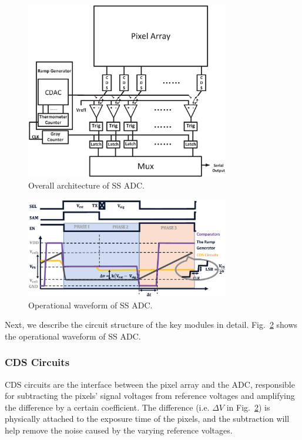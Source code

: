 \begin{figure}[htbp]
	\centerline{\includegraphics[width=3.5in]{./Figures/SSADC.eps}}
	\caption{Overall architecture of SS ADC.}
	\label{SSADC}
\end{figure} 

\begin{figure}[htbp]
	\centerline{\includegraphics[width=3.5in]{./Figures/SSWAVE.eps}}
	\caption{Operational waveform of SS ADC.}
	\label{SSWAVE}
\end{figure}

Next, we describe the circuit structure of the key modules in detail. Fig.~\ref{SSWAVE} shows
the operational waveform of SS ADC. 

\subsubsection{CDS Circuits}

CDS circuits are the interface between the pixel array and the ADC, responsible for subtracting the pixels’ signal voltages from reference voltages and 
amplifying the difference by a certain coefficient. The difference (i.e. $\Delta{V}$ in Fig.~\ref{SSWAVE}) is physically attached to the exposure time of the pixels, 
and the subtraction will help remove the noise caused by the varying reference voltages. 

